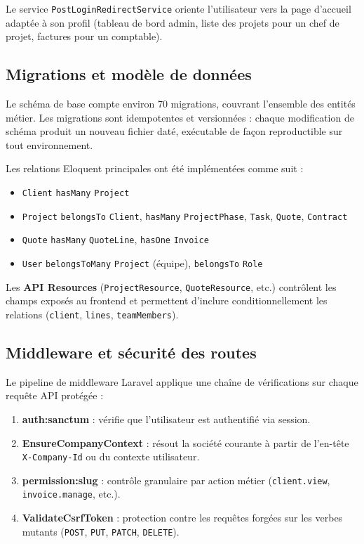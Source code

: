 Le service \texttt{PostLoginRedirectService} oriente l'utilisateur vers la page
d'accueil adaptée à son profil (tableau de bord admin, liste des projets pour un
chef de projet, factures pour un comptable).

\subsection{Migrations et modèle de données}

Le schéma de base compte environ 70 migrations, couvrant l'ensemble des entités métier.
Les migrations sont idempotentes et versionnées : chaque modification de schéma
produit un nouveau fichier daté, exécutable de façon reproductible sur tout
environnement.

\medskip

Les relations Eloquent principales ont été implémentées comme suit :
\begin{itemize}
  \item \texttt{Client} \texttt{hasMany} \texttt{Project}
  \item \texttt{Project} \texttt{belongsTo} \texttt{Client}, \texttt{hasMany} \texttt{ProjectPhase},
  \texttt{Task}, \texttt{Quote}, \texttt{Contract}
  \item \texttt{Quote} \texttt{hasMany} \texttt{QuoteLine}, \texttt{hasOne} \texttt{Invoice}
  \item \texttt{User} \texttt{belongsToMany} \texttt{Project} (équipe), \texttt{belongsTo} \texttt{Role}
\end{itemize}

Les \textbf{API Resources} (\texttt{ProjectResource}, \texttt{QuoteResource}, etc.)
contrôlent les champs exposés au frontend et permettent d'inclure conditionnellement
les relations (\texttt{client}, \texttt{lines}, \texttt{teamMembers}).

\subsection{Middleware et sécurité des routes}

Le pipeline de middleware Laravel applique une chaîne de vérifications sur chaque
requête API protégée :

\begin{enumerate}
  \item \textbf{auth:sanctum} : vérifie que l'utilisateur est authentifié via session.
  \item \textbf{EnsureCompanyContext} : résout la société courante à partir de
  l'en-tête \texttt{X-Company-Id} ou du contexte utilisateur.
  \item \textbf{permission:slug} : contrôle granulaire par action métier
  (\texttt{client.view}, \texttt{invoice.manage}, etc.).
  \item \textbf{ValidateCsrfToken} : protection contre les requêtes forgées sur
  les verbes mutants (\texttt{POST}, \texttt{PUT}, \texttt{PATCH}, \texttt{DELETE}).
\end{enumerate}

